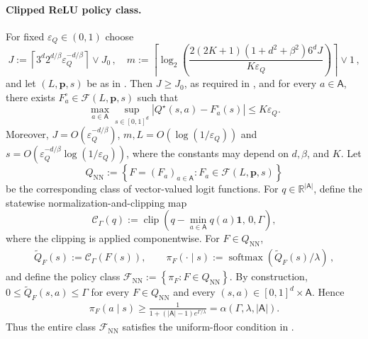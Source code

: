 \documentclass{article}
\theoremstyle{definition}
\theoremstyle{remark}
\theoremstyle{plain}
\def\eqsp{\,}
\numberwithin{equation}{section}
\begin{document}
\paragraph{Clipped ReLU policy class.} For fixed \(\varepsilon_Q\in(0,1)\)
choose
\[
    J
    :=
    \left\lceil
        3^d2^{d/\beta}\varepsilon_Q^{-d/\beta}
    \right\rceil
    \vee J_0\eqsp, \quad     m
    :=
    \left\lceil
        \log_2
        \left(
            \frac{2(2K+1)(1+d^2+\beta^2)6^dJ}
                 {K\varepsilon_Q}
        \right)
    \right\rceil
    \vee1\eqsp,
\]
and let \((L, \mathbf p,s)\) be as in
.
Then \(J\geq J_0\), as required in
, and  for every \(a\in\mathsf A\), there exists
\(F_a^\circ\in\mathcal F(L,\mathbf  p,s)\) such that
\begin{equation}
\label{Q approximation}
    \max_{a\in\mathsf A}
    \sup_{s\in[0,1]^d}
    |Q^\star(s,a)-F_a^\circ(s)|
    \leq
    K\varepsilon_Q.
\end{equation}
Moreover, \(J=O(\varepsilon_Q^{-d/\beta})\),  \(m, L =O(\log(1/\varepsilon_Q))\) and  \(s = O(\varepsilon_Q^{-d/\beta} \log (1/\varepsilon_Q)) \),
where the constants may depend on \(d,\beta\), and \(K\). Let
\[
 Q_{\mathrm{NN}}
    :=
    \left\{
        F=(F_a)_{a\in\mathsf A}:
        F_a\in\mathcal F(L,\mathbf p,s)
    \right\}
\]
be the corresponding class of vector-valued logit functions.
For \(q\in\mathbb R^{|\mathsf A|}\), define the statewise
normalization-and-clipping map
\[
    \mathcal C_\Gamma(q)
    :=
    \operatorname{clip}
    \left(
        q-\min_{a\in\mathsf A}q(a)\mathbf 1,\,
        0,\Gamma
    \right),
\]
where the clipping is applied componentwise. For \(F\in Q_{\mathrm{NN}}\),
\begin{align}
\label{eq:clipping}
    \widetilde Q_F(s)
    :=
    \mathcal C_\Gamma(F(s)),
    \qquad
    \pi_F(\cdot\mid s)
    :=
    \operatorname{softmax}
    \left(
         \widetilde Q_F(s)/\lambda
    \right)\eqsp,
\end{align}
and define the policy class \(\mathcal F_{\mathrm{NN}}
    :=
    \left\{
        \pi_F:
        F\in Q_{\mathrm{NN}}
    \right\}.\)
By construction, \(0
    \leq
    \widetilde Q_F(s,a)
    \leq
    \Gamma\)
for every \(F\in Q_{\mathrm{NN}}\) and every
\((s,a)\in[0,1]^d\times\mathsf A\). Hence
\begin{align}
\label{eq:floor}
    \pi_F(a\mid s)
    \geq
    \frac{1}
    {1+(|\mathsf A|-1)e^{\Gamma/\lambda}}
    =\alpha(\Gamma,\lambda,|\mathsf A|).
\end{align}
Thus the entire class \(\mathcal F_{\mathrm{NN}}\) satisfies the uniform-floor
condition in .
\end{document}
